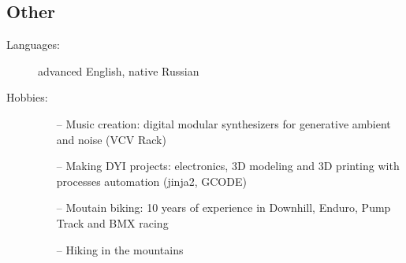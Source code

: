 \documentclass[10pt]{report}
\begin{document}
\subsection*{Other}
\begin{description}
  \item[Languages:]
        advanced English, native Russian
  \item[Hobbies:]
        \begin{itemize}
          \item[]
          \item[--] Music creation: digital modular synthesizers for generative ambient and noise (VCV Rack)
          \item[--] Making DYI projects: electronics, 3D modeling and 3D printing with processes automation (jinja2, GCODE)
          \item[--] Moutain biking: 10 years of experience in Downhill, Enduro, Pump Track and BMX racing
          \item[--] Hiking in the mountains
        \end{itemize}

\end{description}
\end{document}
